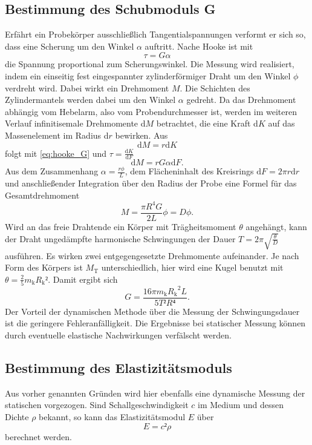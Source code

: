 \subsection{Bestimmung des Schubmoduls G}
Erfährt ein Probekörper ausschließlich Tangentialspannungen verformt er sich so, dass eine Scherung um den Winkel $\alpha$ auftritt. Nache Hooke ist mit
\begin{equation}
\tau=G\alpha
\label{eq:hooke_G}
\end{equation}
 die Spannung proportional zum Scherungswinkel. 
Die Messung wird realisiert, indem ein einseitig fest eingespannter zylinderförmiger Draht um den Winkel $\phi$ verdreht wird. Dabei wirkt ein Drehmoment $M$. Die Schichten des Zylindermantels werden dabei um den Winkel $\alpha$ gedreht. 
Da das Drehmoment abhängig vom Hebelarm, also vom Probendurchmesser ist, werden im weiteren Verlauf infinitisemale Drehmomente d$M$ betrachtet, die eine Kraft d$K$ auf das Massenelement im Radius d$r$ bewirken.
Aus
\begin{equation}
\mathup{d}M=r\mathup{d}K
\end{equation}
folgt mit \eqref{eq:hooke_G} und $\tau=\frac{\mathup{d}K}{\mathup{d}F}$
\begin{equation}
\mathup{d}M=rG\alpha\mathup{d}F.
\end{equation}
Aus dem Zusammenhang $\alpha=\frac{r\phi}{L}$, dem Flächeninhalt des Kreisrings $\mathup{d}F=2\pi r\mathup{d}r$ und anschließender Integration über den Radius der Probe eine Formel für das Gesamtdrehmoment
\begin{equation}
M=\frac{\pi R^4 G}{2L}\phi=D\phi.
\end{equation}
Wird an das freie Drahtende ein Körper mit Trägheitsmoment $\theta$ angehängt, kann der Draht ungedämpfte harmonische Schwingungen der Dauer $T=2\pi\sqrt{\frac{\theta}{D}}$ ausführen. Es wirken zwei entgegengesetzte Drehmomente aufeinander. Je nach Form des Körpers ist $M_\mathup{T}$ unterschiedlich, hier wird eine Kugel benutzt mit $\theta=\frac{2}{5}m_\mathup{k}{R_\mathup{k}}²$. Damit ergibt sich 
\begin{equation}
G=\frac{16\pi m_\mathup{k} {R_\mathup{k}}^2 L}{5T²R⁴}.
\label{eq:G}
\end{equation}
Der Vorteil der dynamischen Methode über die Messung der Schwingungsdauer ist die geringere Fehleranfälligkeit. Die Ergebnisse bei statischer Messung können durch eventuelle elastische Nachwirkungen verfälscht werden.

\subsection{Bestimmung des Elastizitätsmoduls}

Aus vorher genannten Gründen wird hier ebenfalls eine dynamische Messung der statischen vorgezogen. Sind Schallgeschwindigkeit $c$ im Medium und dessen Dichte $\rho$ bekannt, so kann das Elastizitätsmodul $E$ über
\begin{equation}
E=c² \rho
\label{eq:E}
\end{equation}
berechnet werden.



